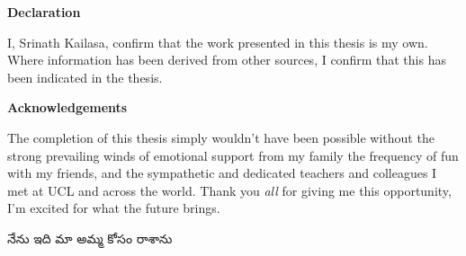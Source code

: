 \thispagestyle{plain}

\begin{center}
    \textbf{Declaration}
\end{center}
I, Srinath Kailasa, confirm that the work presented in this thesis is my own. Where information has been derived from other sources, I confirm that this has been indicated in the thesis.


\begin{center}
    \textbf{Acknowledgements}
\end{center}

The completion of this thesis simply wouldn't have been possible without the strong prevailing winds of emotional support from my family the frequency of fun with my friends, and the sympathetic and dedicated teachers and colleagues I met at UCL and across the world. Thank you \textit{all} for giving me this opportunity, I'm excited for what the future brings.

\begin{center}
   {\tel నేను ఇది మా అమ్మ కోసం రాశాను}
\end{center}